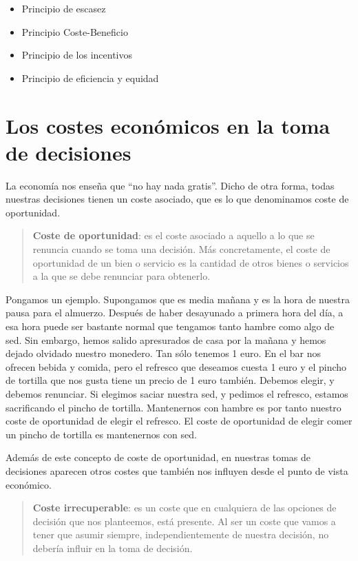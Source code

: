\documentclass[
]{krantz}
\providecommand{\tightlist}{%
  \setlength{\itemsep}{0pt}\setlength{\parskip}{0pt}}
\begin{document}
\begin{itemize}
\tightlist
\item
  Principio de escasez
\item
  Principio Coste-Beneficio
\item
  Principio de los incentivos
\item
  Principio de eficiencia y equidad
\end{itemize}

\hypertarget{los-costes-econuxf3micos-en-la-toma-de-decisiones}{%
\section{Los costes económicos en la toma de decisiones}\label{los-costes-econuxf3micos-en-la-toma-de-decisiones}}

La economía nos enseña que ``no hay nada gratis''. Dicho de otra forma, todas nuestras decisiones tienen un coste asociado, que es lo que denominamos coste de oportunidad.

\begin{quote}
\textbf{Coste de oportunidad}: es el coste asociado a aquello a lo que se renuncia cuando se toma una decisión. Más concretamente, el coste de oportunidad de un bien o servicio es la cantidad de otros bienes o servicios a la que se debe renunciar para obtenerlo.
\end{quote}

Pongamos un ejemplo. Supongamos que es media mañana y es la hora de nuestra pausa para el almuerzo. Después de haber desayunado a primera hora del día, a esa hora puede ser bastante normal que tengamos tanto hambre como algo de sed. Sin embargo, hemos salido apresurados de casa por la mañana y hemos dejado olvidado nuestro monedero. Tan sólo tenemos 1 euro.
En el bar nos ofrecen bebida y comida, pero el refresco que deseamos cuesta 1 euro y el pincho de tortilla que nos gusta tiene un precio de 1 euro también. Debemos elegir, y debemos renunciar. Si elegimos saciar nuestra sed, y pedimos el refresco, estamos sacrificando el pincho de tortilla. Mantenernos con hambre es por tanto nuestro coste de oportunidad de elegir el refresco. El coste de oportunidad de elegir comer un pincho de tortilla es mantenernos con sed.

Además de este concepto de coste de oportunidad, en nuestras tomas de decisiones aparecen otros costes que también nos influyen desde el punto de vista económico.

\begin{quote}
\textbf{Coste irrecuperable}: es un coste que en cualquiera de las opciones de decisión que nos planteemos, está presente. Al ser un coste que vamos a tener que asumir siempre, independientemente de nuestra decisión, no debería influir en la toma de decisión.
\end{quote}
\end{document}
